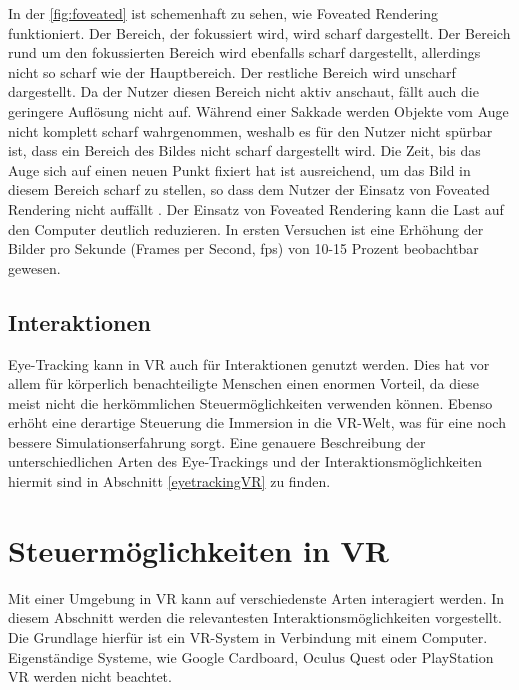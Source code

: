 In der \autoref{fig:foveated} ist schemenhaft zu sehen, wie Foveated Rendering funktioniert. Der Bereich, der fokussiert wird, wird scharf dargestellt. Der Bereich rund um den fokussierten Bereich wird ebenfalls scharf dargestellt, allerdings nicht so scharf wie der Hauptbereich.  Der restliche Bereich wird unscharf dargestellt. Da der Nutzer diesen Bereich nicht aktiv anschaut, fällt auch die geringere Auflösung nicht auf. Während einer Sakkade werden Objekte vom Auge nicht komplett scharf wahrgenommen, weshalb es für den Nutzer nicht spürbar ist, dass ein Bereich des Bildes nicht scharf dargestellt wird. Die Zeit, bis das Auge sich auf einen neuen Punkt fixiert hat ist ausreichend, um das Bild in diesem Bereich scharf zu stellen, so dass dem Nutzer der Einsatz von Foveated Rendering nicht auffällt \cite{Albert.2017}. Der Einsatz von Foveated Rendering kann die Last auf den Computer deutlich reduzieren. In ersten Versuchen ist eine Erhöhung der Bilder pro Sekunde (Frames per Second, fps) von 10-15 Prozent beobachtbar gewesen. \cite{H.Kim.2018}

\subsection{Interaktionen}
Eye-Tracking kann in VR auch für Interaktionen genutzt werden. Dies hat vor allem für körperlich benachteiligte Menschen einen enormen Vorteil, da diese meist nicht die herkömmlichen Steuermöglichkeiten verwenden können. Ebenso erhöht eine derartige Steuerung die Immersion in die VR-Welt, was für eine noch bessere Simulationserfahrung sorgt. Eine genauere Beschreibung der unterschiedlichen Arten des Eye-Trackings und der Interaktionsmöglichkeiten hiermit sind in Abschnitt \ref{eyetrackingVR} zu finden.

\section{Steuermöglichkeiten in VR}
Mit einer Umgebung in VR kann auf verschiedenste Arten interagiert werden. In diesem Abschnitt werden die relevantesten Interaktionsmöglichkeiten vorgestellt. Die Grundlage hierfür ist ein VR-System in Verbindung mit einem Computer. Eigenständige Systeme, wie Google Cardboard, Oculus Quest oder PlayStation VR werden nicht beachtet.

